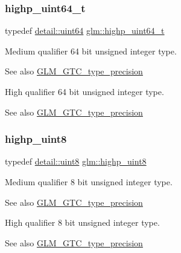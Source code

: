 \subsubsection{\texorpdfstring{highp\+\_\+uint64\+\_\+t}{highp\_uint64\_t}}
{\footnotesize\ttfamily typedef \hyperlink{namespaceglm_1_1detail_adec4b19bf4982125e122db2fe03c5810}{detail\+::uint64} \hyperlink{group__gtc__type__precision_ga6e66f40c5909bfc872b068187fa6029e}{glm\+::highp\+\_\+uint64\+\_\+t}}

Medium qualifier 64 bit unsigned integer type. \begin{DoxySeeAlso}{See also}
\hyperlink{group__gtc__type__precision}{G\+L\+M\+\_\+\+G\+T\+C\+\_\+type\+\_\+precision}
\end{DoxySeeAlso}
High qualifier 64 bit unsigned integer type. \begin{DoxySeeAlso}{See also}
\hyperlink{group__gtc__type__precision}{G\+L\+M\+\_\+\+G\+T\+C\+\_\+type\+\_\+precision} 
\end{DoxySeeAlso}
\mbox{\label{group__gtc__type__precision_ga2c27c6dd26e893786f04b10f99c1ee95}} 
\subsubsection{\texorpdfstring{highp\+\_\+uint8}{highp\_uint8}}
{\footnotesize\ttfamily typedef \hyperlink{namespaceglm_1_1detail_aef2588f97d090cc19fbbe0c74fe17c8f}{detail\+::uint8} \hyperlink{group__gtc__type__precision_ga2c27c6dd26e893786f04b10f99c1ee95}{glm\+::highp\+\_\+uint8}}

Medium qualifier 8 bit unsigned integer type. \begin{DoxySeeAlso}{See also}
\hyperlink{group__gtc__type__precision}{G\+L\+M\+\_\+\+G\+T\+C\+\_\+type\+\_\+precision}
\end{DoxySeeAlso}
High qualifier 8 bit unsigned integer type. \begin{DoxySeeAlso}{See also}
\hyperlink{group__gtc__type__precision}{G\+L\+M\+\_\+\+G\+T\+C\+\_\+type\+\_\+precision} 
\end{DoxySeeAlso}
\mbox{\label{group__gtc__type__precision_ga9ba529fcc75b82d23da979f0ce6e4518}} 
